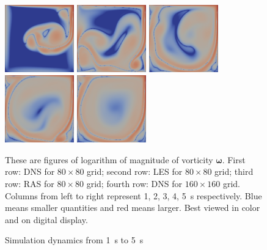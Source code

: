 \documentclass[english, nochinese]{pkupaper}
\begin{document}
\begin{figure}[htbp]
{{
\includegraphics[width=3cm]{Results/Figure02p.png}
\includegraphics[width=3cm]{Results/Figure02q.png}
\includegraphics[width=3cm]{Results/Figure02r.png}
\includegraphics[width=3cm]{Results/Figure02s.png}
\includegraphics[width=3cm]{Results/Figure02t.png}
}
\caption{Simulation dynamics from \SI{1}{s} to \SI{5}{s}}
\label{Fig:Dy}
}
{
\footnotesize
These are figures of logarithm of magnitude of vorticity $\bm{\omega}$. First row: DNS for $ 80 \times 80 $ grid; second row: LES for $ 80 \times 80 $ grid; third row: RAS for $ 80 \times 80 $ grid; fourth row: DNS for $ 160 \times 160 $ grid. Columns from left to right represent 1, 2, 3, 4, \SI{5}{\second} respectively. Blue means smaller quantities and red means larger. Best viewed in color and on digital display.
}
\end{figure}
\end{document}
